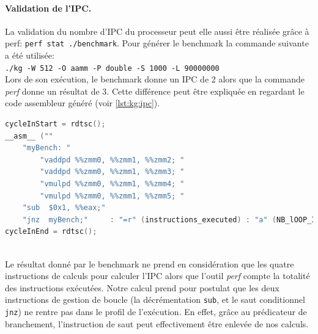         
        \paragraph{Validation de l'IPC.} 
        
            La validation du nombre d'\gls{IPC} du processeur peut elle aussi être réalisée grâce à perf: \verb|perf stat ./benchmark|. Pour générer le benchmark la commande suivante a été utilisée:\\
            \verb|./kg -W 512 -O aamm -P double -S 1000 -L 90000000|\\
            Lors de son exécution, le benchmark donne un IPC de 2 alors que la commande \textit{perf} donne un résultat de 3. Cette différence peut être expliquée en regardant le code assembleur généré (voir \autoref{lst:kg:ipc}).
        
\begin{minipage}{0.965\linewidth}
        \begin{lstlisting}[label=lst:kg:ipc ,language=C, caption={Code généré par la commande ./kg -W 512 -O aamm -P double. Le benchmark mesure la performance du la boucle à l'aide du compteur de cycle (\texttt{rdtsc()}). Cette mesure comprend l'exécution des instructions de calculs du kernel mais aussi les deux instructions de la gestion de boucle \texttt{sub} et \texttt{jnz}.}]
cycleInStart = rdtsc();
__asm__ ("" 
    "myBench: " 
		"vaddpd %%zmm0, %%zmm1, %%zmm2; "
		"vaddpd %%zmm0, %%zmm1, %%zmm3; "
		"vmulpd %%zmm0, %%zmm1, %%zmm4; "
		"vmulpd %%zmm0, %%zmm1, %%zmm5; "
    "sub  $0x1, %%eax;"
    "jnz  myBench;"		: "=r" (instructions_executed) : "a" (NB_lOOP_IN));
cycleInEnd = rdtsc();
\end{lstlisting}
\end{minipage}\\
            Le résultat donné par le benchmark ne prend en considération que les quatre instructions de calculs pour calculer l'IPC alors que l'outil \textit{perf} compte la totalité des instructions exécutées. Notre calcul prend pour postulat que les deux instructions de gestion de boucle (la décrémentation \verb|sub|, et le saut conditionnel \verb|jnz|) ne rentre pas dans le profil de l'exécution. En effet, grâce au prédicateur de branchement, l'instruction de saut peut effectivement être enlevée de nos calculs. 

